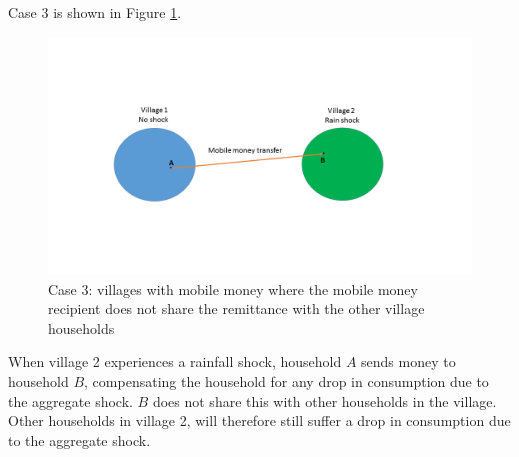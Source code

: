 Case 3 is shown in Figure \ref{fig:link2}.
\begin{figure}[p]
    \centering
\includegraphics[width=17cm,trim=0cm 4cm 0cm 4cm,clip=true, keepaspectratio]{Slide3new} 
\caption{Case 3: villages with mobile money where the mobile money recipient does not share the remittance with the other village households }
    \label{fig:link2}
\end{figure}
When village 2 experiences a rainfall shock, household $A$ sends money to household $B$, compensating the household for any drop in consumption due to the aggregate shock. $B$ does not share this with other households in the village. Other households in village 2, will therefore still suffer a drop in consumption due to the aggregate shock.



